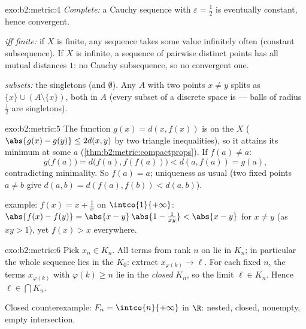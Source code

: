 \begin{solution}{exo:b2:metric:4}
\emph{Complete:} a Cauchy sequence with $\varepsilon = \frac12$ is
eventually constant, hence convergent.

\emph{ iff finite:} if $X$ is finite, any sequence takes some
value infinitely often (constant subsequence). If $X$ is infinite,
a sequence of pairwise distinct points has all mutual distances $1$:
no Cauchy subsequence, so no convergent one.

\emph{ subsets:} the singletons (and $\emptyset$). Any $A$
with two points $x \neq y$ splits as $\{x\} \cup (A
\setminus\{x\})$, both  in $A$ (every subset of a discrete
space is  --- balls of radius $\frac12$ are singletons).
\end{solution}

\begin{solution}{exo:b2:metric:5}
The function $g(x) = d(x, f(x))$ is  on the  $X$
($\abs{g(x) - g(y)} \leq 2d(x,y)$ by two triangle inequalities), so
it attains its minimum at some $a$
(\cref{thm:b2:metric:compactprops}). If $f(a) \neq a$:
\[
g\bigl(f(a)\bigr) = d\bigl(f(a), f(f(a))\bigr) < d(a, f(a)) = g(a),
\]
contradicting minimality. So $f(a) = a$; uniqueness as usual (two
fixed points $a \neq b$ give $d(a,b) = d(f(a), f(b)) < d(a,b)$).

 example: $f(x) = x + \frac1x$ on $\intco{1}{+\infty}$:
$\abs{f(x) - f(y)} = \abs{x - y}\,\abs{1 - \frac{1}{xy}} < \abs{x -
y}$ for $x \neq y$ (as $xy > 1$), yet $f(x) > x$ everywhere.
\end{solution}

\begin{solution}{exo:b2:metric:6}
Pick $x_n \in K_n$. All terms from rank $n$ on lie in $K_n$; in
particular the whole sequence lies in the  $K_0$: extract
$x_{\varphi(k)} \to \ell$. For each fixed $n$, the terms
$x_{\varphi(k)}$ with $\varphi(k) \geq n$ lie in the \emph{closed}
$K_n$, so the limit $\ell \in K_n$. Hence $\ell \in \bigcap K_n$.

Closed counterexample: $F_n = \intco{n}{+\infty}$ in $\R$: nested,
closed, nonempty, empty intersection.
\end{solution}

